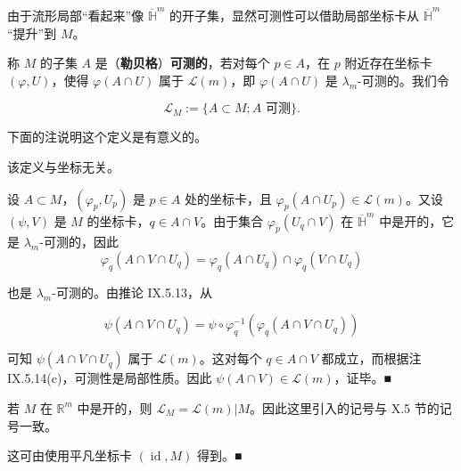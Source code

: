 由于流形局部“看起来”像 $ \overline{\mathbb{H}}^m $ 的开子集，显然可测性可以借助局部坐标卡从 $ \overline{\mathbb{H}}^m $ “提升”到 $ M $。

称 $ M $ 的子集 $ A $ 是（\textbf{勒贝格}）\textbf{可测的}，若对每个 $ p \in A $，在 $ p $ 附近存在坐标卡 $ (\varphi, U) $，使得 $ \varphi(A \cap U) $ 属于 $ \mathcal{L}(m) $，即 $ \varphi(A \cap U) $ 是 $ \lambda_m $-可测的。我们令

\[
\mathcal{L}_M := \{ A \subset M ; A \text{ 可测} \} .
\]

下面的注说明这个定义是有意义的。

\begin{remark}

\begin{items}
\item

该定义与坐标无关。

\proofhead
设 $ A \subset M $，$ (\varphi_p, U_p) $ 是 $ p \in A $ 处的坐标卡，且 $ \varphi_p(A \cap U_p) \in \mathcal{L}(m) $。又设 $ (\psi, V) $ 是 $ M $ 的坐标卡，$ q \in A \cap V $。由于集合 $ \varphi_p(U_q \cap V) $ 在 $ \overline{\mathbb{H}}^m $ 中是开的，它是 $ \lambda_m $-可测的，因此
\[
\varphi_q(A \cap V \cap U_q) = \varphi_q(A \cap U_q) \cap \varphi_q(V \cap U_q)
\]

也是 $ \lambda_m $-可测的。由推论 IX.5.13，从

\[
\psi(A \cap V \cap U_q) = \psi \circ \varphi_q^{-1}\left(\varphi_q(A \cap V \cap U_q)\right)
\]

可知 $ \psi(A \cap V \cap U_q) $ 属于 $ \mathcal{L}(m) $。这对每个 $ q \in A \cap V $ 都成立，而根据注 IX.5.14(c)，可测性是局部性质。因此 $ \psi(A \cap V) \in \mathcal{L}(m) $，证毕。\nobreak\hspace{0.35em}■

\item

若 $ M $ 在 $ \mathbb{R}^m $ 中是开的，则 $ \mathcal{L}_M = \mathcal{L}(m)|M $。因此这里引入的记号与 X.5 节的记号一致。

\proofhead
这可由使用平凡坐标卡 $ (\operatorname{id}, M) $ 得到。\nobreak\hspace{0.35em}■
\end{items}

\end{remark}

